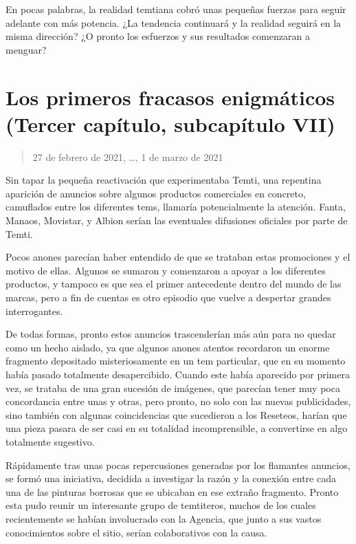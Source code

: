 \documentclass[
  spanish,
]{book}
\begin{document}
En pocas palabras, la realidad temtiana cobró unas pequeñas fuerzas para seguir adelante con más potencia. ¿La tendencia continuará y la realidad seguirá en la misma dirección? ¿O pronto los esfuerzos y sus resultados comenzaran a menguar?

\hypertarget{los-primeros-fracasos-enigmuxe1ticos-tercer-capuxedtulo-subcapuxedtulo-vii}{%
\section{Los primeros fracasos enigmáticos (Tercer capítulo, subcapítulo VII)}\label{los-primeros-fracasos-enigmuxe1ticos-tercer-capuxedtulo-subcapuxedtulo-vii}}

\begin{quote}
27 de febrero de 2021, \ldots, 1 de marzo de 2021
\end{quote}

Sin tapar la pequeña reactivación que experimentaba Temti, una repentina aparición de anuncios sobre algunos productos comerciales en concreto, camuflados entre los diferentes tems, llamaría potencialmente la atención. Fanta, Manaos, Movistar, y Albion serían las eventuales difusiones oficiales por parte de Temti.

Pocos anones parecían haber entendido de que se trataban estas promociones y el motivo de ellas. Algunos se sumaron y comenzaron a apoyar a los diferentes productos, y tampoco es que sea el primer antecedente dentro del mundo de las marcas, pero a fin de cuentas es otro episodio que vuelve a despertar grandes interrogantes.

De todas formas, pronto estos anuncios trascenderían más aún para no quedar como un hecho aislado, ya que algunos anones atentos recordaron un enorme fragmento depositado misteriosamente en un tem particular, que en su momento había pasado totalmente desapercibido. Cuando este había aparecido por primera vez, se trataba de una gran sucesión de imágenes, que parecían tener muy poca concordancia entre unas y otras, pero pronto, no solo con las nuevas publicidades, sino también con algunas coincidencias que sucedieron a los Reseteos, harían que una pieza pasara de ser casi en su totalidad incomprensible, a convertirse en algo totalmente sugestivo.

Rápidamente tras unas pocas repercusiones generadas por los flamantes anuncios, se formó una iniciativa, decidida a investigar la razón y la conexión entre cada una de las pinturas borrosas que se ubicaban en ese extraño fragmento. Pronto esta pudo reunir un interesante grupo de temtiteros, muchos de los cuales recientemente se habían involucrado con la Agencia, que junto a sus vastos conocimientos sobre el sitio, serían colaborativos con la causa.
\end{document}
